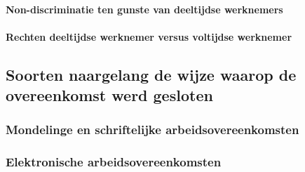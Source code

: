 \paragraph{Non-discriminatie ten gunste van deeltijdse werknemers}

\paragraph{Rechten deeltijdse werknemer versus voltijdse werknemer}


\subsection{Soorten naargelang de wijze waarop de overeenkomst werd gesloten}

\subsubsection{Mondelinge en schriftelijke arbeidsovereenkomsten}

\subsubsection{Elektronische arbeidsovereenkomsten}

